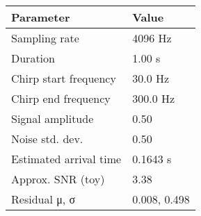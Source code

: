\begin{tabular}{ll}
\toprule
Parameter & Value \\
\midrule
Sampling rate & 4096 Hz \\
Duration & 1.00 s \\
Chirp start frequency & 30.0 Hz \\
Chirp end frequency & 300.0 Hz \\
Signal amplitude & 0.50 \\
Noise std. dev. & 0.50 \\
Estimated arrival time & 0.1643 s \\
Approx. SNR (toy) & 3.38 \\
Residual μ, σ & 0.008, 0.498 \\
\bottomrule
\end{tabular}

